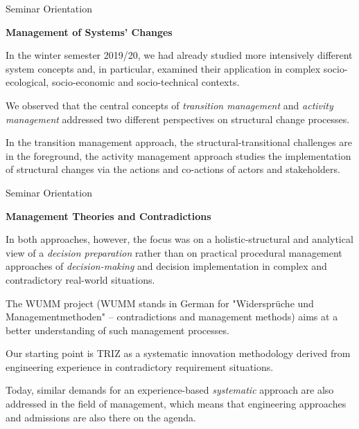\documentclass{beamer}
\newcommand{\ueberschrift}[1]{\begin{center}\bf #1\end{center}}
\begin{document}
\begin{frame}{Seminar Orientation}

\ueberschrift{Management of Systems' Changes}

In the winter semester 2019/20, we had already studied more intensively
different system concepts and, in particular, examined their application in
complex socio-ecological, socio-economic and socio-technical contexts.

We observed that the central concepts of \emph{transition management} and
\emph{activity management} addressed two different perspectives on structural
change processes.

In the transition management approach, the structural-transitional challenges
are in the foreground, the activity management approach studies the
implementation of structural changes via the actions and co-actions of actors
and stakeholders.
\end{frame}

\begin{frame}{Seminar Orientation}

  \ueberschrift{Management Theories and Contradictions}
\small
In both approaches, however, the focus was on a holistic-structural and
analytical view of a \emph{decision preparation} rather than on practical
procedural management approaches of \emph{decision-making} and decision
implementation in complex and contradictory real-world situations.

The WUMM project (WUMM stands in German for "Widersprüche und
Managementmethoden" -- contradictions and management methods) aims at a better
understanding of such management processes.

Our starting point is TRIZ as a systematic innovation methodology derived from
engineering experience in contradictory requirement situations.

Today, similar demands for an experience-based \emph{systematic} approach are
also addressed in the field of management, which means that engineering
approaches and admissions are also there on the agenda.\vspace*{2em}
\end{frame}
\end{document}
